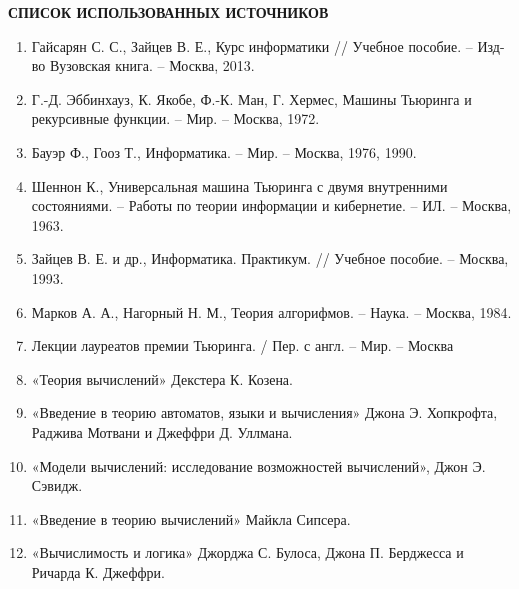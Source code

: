 \documentclass{article}
\begin{document}
\begin{center}
    \textbf{СПИСОК ИСПОЛЬЗОВАННЫХ ИСТОЧНИКОВ}\\
    \begin{enumerate} 
    \item Гайсарян С. С., Зайцев В. Е., Курс информатики // Учебное пособие. – Изд-во Вузовская книга. – Москва, 2013.
    \vspace{0.2cm}
    \item Г.-Д. Эббинхауз, К. Якобе, Ф.-К. Ман, Г. Хермес, Машины Тьюринга и рекурсивные функции. – Мир. – Москва, 1972.
    \vspace{0.2cm}
    \item Бауэр Ф., Гооз Т., Информатика. – Мир. – Москва, 1976, 1990.
    \vspace{0.2cm}
    \item Шеннон К., Универсальная машина Тьюринга с двумя внутренними состояниями. – Работы по теории информации и кибернетие. – ИЛ. – Москва, 1963.
    \vspace{0.2cm}
    \item Зайцев В. Е. и др., Информатика. Практикум. // Учебное пособие. – Москва, 1993.
    \vspace{0.2cm}
    \item Марков А. А., Нагорный Н. М., Теория алгорифмов. – Наука. – Москва, 1984.
    \vspace{0.2cm}
    \item Лекции лауреатов премии Тьюринга. / Пер. с англ. – Мир. – Москва
    \vspace{-0.15cm}
    \item «Теория вычислений» Декстера К. Козена.
    \vspace{0.2cm}
    \item «Введение в теорию автоматов, языки и вычисления» Джона Э. Хопкрофта, Раджива Мотвани и Джеффри Д. Уллмана.
    \vspace{0.2cm}
    \item «Модели вычислений: исследование возможностей вычислений», Джон Э. Сэвидж.
    \vspace{0.2cm}
    \item «Введение в теорию вычислений» Майкла Сипсера.
    \vspace{0.2cm}
    \item «Вычислимость и логика» Джорджа С. Булоса, Джона П. Берджесса и Ричарда К. Джеффри.
    \end{enumerate}    
\end{center}
\end{document}
